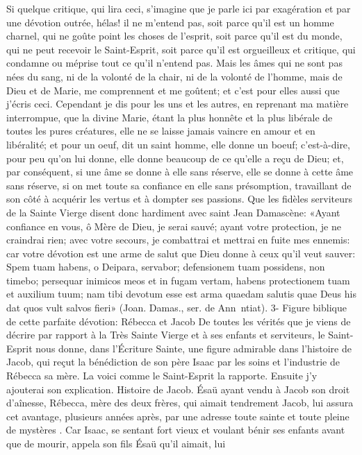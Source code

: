  Si quelque critique, qui lira ceci, s'imagine que je parle ici par exagération et par une dévotion outrée, hélas! il
ne m'entend pas, soit parce qu'il est un homme charnel, qui ne goûte point les choses de l'esprit, soit parce qu'il
est du monde, qui ne peut recevoir le Saint-Esprit, soit parce qu'il est orgueilleux et critique, qui condamne ou
méprise tout ce qu'il n'entend pas. Mais les âmes qui ne sont pas nées du sang, ni de la volonté de la chair, ni de
la volonté de l'homme, mais de Dieu et de Marie, me comprennent et me goûtent; et c'est pour elles aussi que
j'écris ceci.
 Cependant je dis pour les uns et les autres, en reprenant ma matière interrompue, que la divine Marie, étant
la plus honnête et la plus libérale de toutes les pures créatures, elle ne se laisse jamais vaincre en amour et en
libéralité; et pour un oeuf, dit un saint homme, elle donne un boeuf; c'est-à-dire, pour peu qu'on lui donne, elle
donne beaucoup de ce qu'elle a reçu de Dieu; et, par conséquent, si une âme se donne à elle sans réserve, elle se
donne à cette âme sans réserve, si on met toute sa confiance en elle sans présomption, travaillant de son côté à
acquérir les vertus et à dompter ses passions.
 Que les fidèles serviteurs de la Sainte Vierge disent donc hardiment avec saint Jean Damascène: «Ayant
confiance en vous, ô Mère de Dieu, je serai sauvé; ayant votre protection, je ne craindrai rien; avec votre secours,
je combattrai et mettrai en fuite mes ennemis: car votre dévotion est une arme de salut que Dieu donne à ceux
qu'il veut sauver: Spem tuam habens, o Deipara, servabor; defensionem tuam possidens, non timebo; persequar
inimicos meos et in fugam vertam, habens protectionem tuam et auxilium tuum; nam tibi devotum esse est arma
quaedam salutis quae Deus his dat quos vult salvos fieri» (Joan. Damas., ser. de Ann~ntiat).
3- Figure biblique de cette parfaite dévotion: Rébecca et Jacob
 De toutes les vérités que je viens de décrire par rapport à la Très Sainte Vierge et à ses enfants et serviteurs,
le Saint-Esprit nous donne, dans l'Écriture Sainte, une figure admirable dans l'histoire de Jacob, qui reçut la
bénédiction de son père Isaac par les soins et l'industrie de Rébecca sa mère. La voici comme le Saint-Esprit la
rapporte. Ensuite j'y ajouterai son explication.
Histoire de Jacob.
 Ésaü ayant vendu à Jacob son droit d'aînesse, Rébecca, mère des deux frères, qui aimait tendrement Jacob,
lui assura cet avantage, plusieurs années après, par une adresse toute sainte et toute pleine de mystères . Car
Isaac, se sentant fort vieux et voulant bénir ses enfants avant que de mourir, appela son fils Ésaü qu'il aimait, lui
